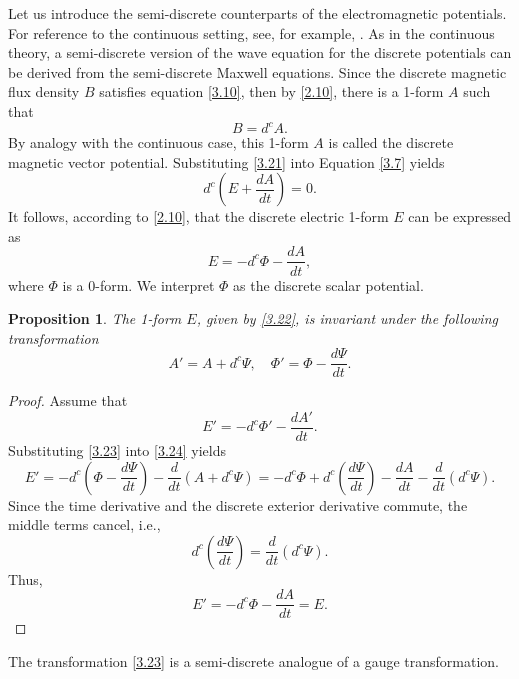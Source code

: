 \documentclass[english]{article}
\theoremstyle{plain}
\newtheorem{prop}[thm]{Proposition}
\theoremstyle{definition}
\theoremstyle{remark}
\numberwithin{equation}{section}
\begin{document}
Let us introduce the semi-discrete counterparts of the electromagnetic potentials. For reference to the continuous setting, see, for example, \cite{WR}. As in the continuous theory, a semi-discrete version of the wave equation for the discrete potentials can be derived from the semi-discrete Maxwell equations. Since the discrete magnetic flux density $B$ satisfies equation \eqref{3.10}, then by \eqref{2.10}, there is a 1-form $A$ such that
\begin{equation}\label{3.21}
  B=d^c A.
 \end{equation}
By analogy with the continuous case,  this 1-form $A$ is called the discrete magnetic vector potential. Substituting \eqref{3.21} into Equation \eqref{3.7} yields
\begin{equation*}
  d^c \left(E+\frac{dA}{dt}\right )=0.
 \end{equation*}
 It follows,  according to \eqref{2.10}, that  the discrete electric 1-form $E$ can be expressed as
 \begin{equation}\label{3.22}
 E=-d^c \Phi-\frac{dA}{dt},
 \end{equation}
where $\Phi$ is a  0-form. We interpret $\Phi$ as the discrete scalar potential.
\begin{prop}
The 1-form $E$, given by \eqref{3.22}, is invariant under the following transformation
 \begin{equation}\label{3.23}
 A'=A+d^c\Psi, \quad \Phi'=\Phi-\frac{d\Psi}{dt}.
\end{equation}
\end{prop}
\begin{proof}
Assume that
\begin{equation}\label{3.24}
E'=-d^c \Phi'-\frac{dA'}{dt}.
\end{equation}
Substituting \eqref{3.23} into \eqref{3.24} yields
\begin{equation*}
E' = -d^c \left( \Phi - \frac{d\Psi}{dt} \right) - \frac{d}{dt} \left( A + d^c \Psi \right) = -d^c \Phi + d^c \left( \frac{d\Psi}{dt} \right)- \frac{dA}{dt} - \frac{d}{dt}(d^c \Psi).
\end{equation*}
Since the time derivative and the discrete exterior derivative commute, the middle terms cancel, i.e.,
\begin{equation*}
 d^c \left( \frac{d\Psi}{dt} \right)=\frac{d}{dt}(d^c \Psi).
 \end{equation*}
Thus,
\begin{equation*}
E'=-d^c \Phi-\frac{dA}{dt}=E.
\end{equation*}
\end{proof}
The transformation \eqref{3.23} is a semi-discrete analogue of a gauge transformation.
\end{document}
